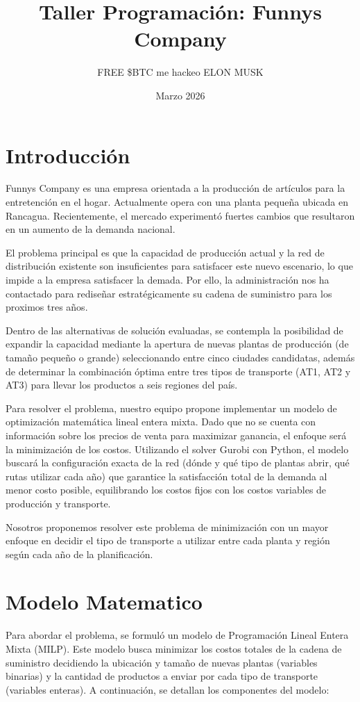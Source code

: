 \documentclass{article}
\title{Taller Programación: Funnys Company}
\author{FREE \$BTC me hackeo ELON MUSK }
\date{Marzo 2026}
\begin{document}
\maketitle
\newpage

\tableofcontents
\newpage

\section{Introducción}
Funnys Company es una empresa orientada a la producción de artículos para la entretención en el hogar. Actualmente opera con una planta pequeña ubicada en Rancagua. Recientemente, el mercado experimentó fuertes cambios que resultaron en un aumento de la demanda nacional.

El problema principal es que la capacidad de producción actual y la red de distribución existente son insuficientes para satisfacer este nuevo escenario, lo que impide a la empresa satisfacer la demada. Por ello, la administración nos ha contactado para rediseñar estratégicamente su cadena de suministro para los proximos tres años.

Dentro de las alternativas de solución evaluadas, se contempla la posibilidad de expandir la capacidad mediante la apertura de nuevas plantas de producción (de tamaño pequeño o grande) seleccionando entre cinco ciudades candidatas, además de determinar la combinación óptima entre tres tipos de transporte (AT1, AT2 y AT3) para llevar los productos a seis regiones del país.

Para resolver el problema, nuestro equipo propone implementar un modelo de optimización matemática lineal entera mixta. Dado que no se cuenta con información sobre los precios de venta para maximizar ganancia, el enfoque será la minimización de los costos. Utilizando el solver Gurobi con Python, el modelo buscará la configuración exacta de la red (dónde y qué tipo de plantas abrir, qué rutas utilizar cada año) que garantice la satisfacción total de la demanda al menor costo posible, equilibrando los costos fijos con los costos variables de producción y transporte.

Nosotros proponemos resolver este problema de minimización con un mayor enfoque en decidir el tipo de transporte a utilizar entre cada planta y región según cada año de la planificación. 

\section{Modelo Matematico}
Para abordar el problema, se formuló un modelo de Programación Lineal Entera Mixta (MILP). Este modelo busca minimizar los costos totales de la cadena de suministro decidiendo la ubicación y tamaño de nuevas plantas (variables binarias) y la cantidad de productos a enviar por cada tipo de transporte (variables enteras). A continuación, se detallan los componentes del modelo:
\end{document}
